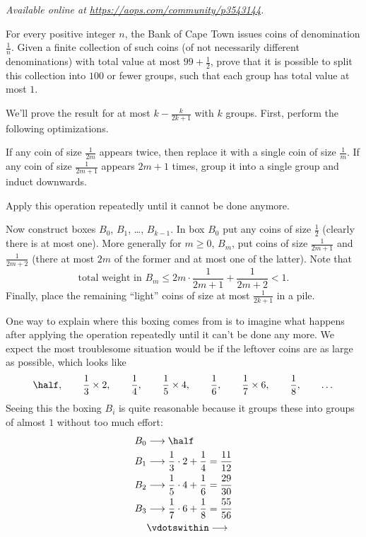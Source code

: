 \textsl{Available online at \url{https://aops.com/community/p3543144}.}
\begin{mdframed}[style=mdpurplebox,frametitle={Problem statement}]
For every positive integer $n$,
the Bank of Cape Town issues coins of denomination $\frac 1n$.
Given a finite collection of such coins (of not necessarily different denominations)
with total value at most $99 + \frac12$, prove that it is possible to split
this collection into $100$ or fewer groups, such that each group has total value at most $1$.
\end{mdframed}
We'll prove the result
for at most $k - \frac{k}{2k+1}$ with $k$ groups.
First, perform the following optimizations.
\begin{itemize}
  \ii If any coin of size $\frac{1}{2m}$ appears twice,
  then replace it with a single coin of size $\frac{1}{m}$.
  \ii If any coin of size $\frac{1}{2m+1}$ appears $2m+1$ times,
  group it into a single group and induct downwards.
\end{itemize}
Apply this operation repeatedly until it cannot be done anymore.

Now construct boxes $B_0$, $B_1$, \dots, $B_{k-1}$.
In box $B_0$ put any coins of size $\tfrac 12$ (clearly there is at most one).
More generally for $m \ge 0$, $B_m$, put coins of size
$\frac{1}{2m+1}$ and $\frac{1}{2m+2}$
(there at most $2m$ of the former and at most one of the latter).
Note that
\[ \text{total weight in $B_m$} \le 2m \cdot \frac{1}{2m+1} + \frac{1}{2m+2} < 1. \]
Finally, place the remaining ``light'' coins of size at most $\frac{1}{2k+1}$ in a pile.
\begin{remark*}
  One way to explain where this boxing comes from is to imagine
  what happens after applying the operation repeatedly until it can't be done any more.
  We expect the most troublesome situation would be if the leftover coins are
  as large as possible, which looks like
  \[ \half, \qquad \frac13 \times 2, \qquad \frac14, \qquad \frac15 \times 4,
    \qquad \frac16, \qquad \frac17 \times 6, \qquad \frac 18, \qquad \dots \]
  Seeing this the boxing $B_i$ is quite reasonable because it groups these
  into groups of almost $1$ without too much effort:
  \begin{align*}
    B_0 &\longrightarrow \half \\
    B_1 &\longrightarrow \frac13 \cdot 2 + \frac 14 = \frac{11}{12} \\
    B_2 &\longrightarrow \frac15 \cdot 4 + \frac 16 = \frac{29}{30} \\
    B_3 &\longrightarrow \frac17 \cdot 6 + \frac 18 = \frac{55}{56} \\
    &\vdotswithin\longrightarrow
  \end{align*}
\end{remark*}


